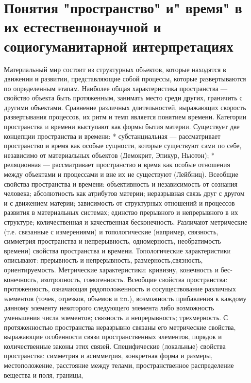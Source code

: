 \documentclass[12pt]{article}
\begin{document}
\section{Понятия "пространство" и" время" в их естественнонаучной и социогуманитарной интерпретациях}
Материальный  мир  состоит  из  структурных  объектов,  которые  находятся  в  движении  и  развитии,
представляющие собой процессы, которые развертываются по определенным этапам.
Наиболее общая характеристика пространства — свойство объекта быть протяженным, занимать место среди
других, граничить с другими объектами.
Сравнение  различных  длительностей,  выражающих  скорость  развертывания  процессов,  их  ритм  и  темп
является понятием времени.
Категории  пространства  и  времени  выступают  как  формы  бытия  материи.  Существует  две  концепции
пространства и времени:
* субстанциальная — рассматривает пространство и время как особые сущности, которые существуют сами
по себе, независимо от материальных объектов (Демокрит, Эпикур, Ньютон);
* реляционная — рассматривает пространство и время как особые отношения между объектами и процессами
и вне их не существуют (Лейбниц).
Всеобщие  свойства  пространства  и  времени:  объективность  и  независимость  от  сознания  человека;
абсолютность как атрибутов материи; неразрывная связь друг с другом и с движением материи; зависимость от
структурных отношений и процессов развития в материальных системах; единство прерывного и непрерывного
в их структуре; количественная и качественная бесконечность.
Различают метрические (т.е. связанные с измерениями) и топологические (например, связность, симметрия
пространства и непрерывность, одномерность, необратимость времени) свойства пространства и времени.
Топологические  характеристики  описывают:  прерывность  и  непрерывность,  размерность,свяэность,
ориентируемость.
Метрические характеристики: кривизну, конечность и бес-конечносгь, изотропность, гомогенность.
Всеобщие  свойства  пространства:  протяженность,  означающая  рядоположенность  и  сосуществование
различных элементов (точек, отрезков, объемов и i:n.), возможность прибавления к каждому данному элементу
некоторого следующего элемента либо возможность уменьшения числа элементов; связность и непрерывность;
трехмерность.
С протяженностью пространства неразрывно связаны его метрические свойства, выражающие особенности
связи пространственных элементов, порядок и количественные законы этих связей.
Специфические (локальные) свойства пространства: симметрия и асимметрия, конкретная форма и размеры,
местоположение,  расстояние  между  телами,  пространственное  распределение  вещества  и  поля,  границы,
\end{document}
